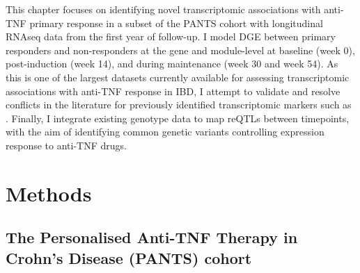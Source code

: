 This chapter focuses on identifying novel transcriptomic associations with anti-\gls{TNF} primary response 
in a subset of the \gls{PANTS} cohort with longitudinal \gls{RNAseq} data from the first year of follow-up.
I model \gls{DGE} between primary responders and non-responders at the gene and module-level 
at baseline (week 0), post-induction (week 14), and during maintenance (week 30 and week 54).
As this is one of the largest datasets currently available for assessing transcriptomic associations with anti-\gls{TNF} response in \gls{IBD},
I attempt to validate and resolve conflicts in the literature for previously identified transcriptomic markers such as .
Finally, I integrate existing genotype data to map \glspl{reQTL} between timepoints,
with the aim of identifying common genetic variants controlling expression response to anti-\gls{TNF} drugs.


\section{Methods}

\subsection{The Personalised Anti-TNF Therapy in Crohn's Disease (PANTS) cohort}

